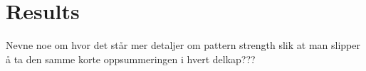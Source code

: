 \chapter{Results}\label{chap:analysis}

	Nevne noe om hvor det står mer detaljer om pattern strength slik at man slipper å ta den samme korte oppsummeringen i hvert delkap???

	